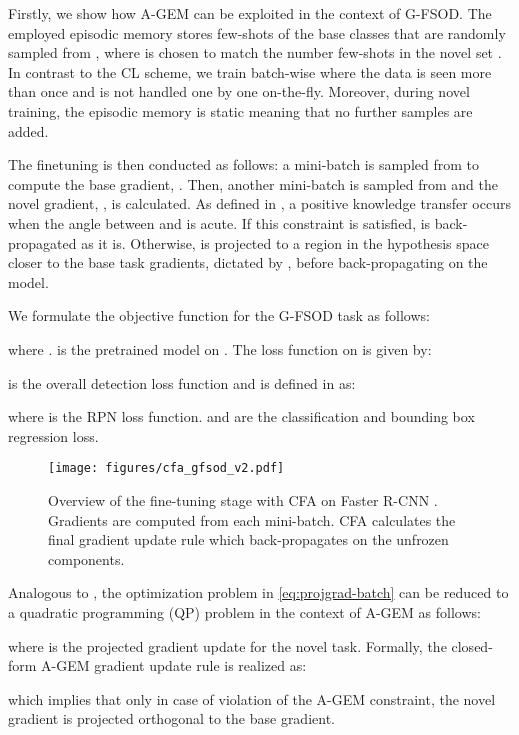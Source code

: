 \documentclass[10pt,twocolumn,letterpaper]{article}
\begin{document}
Firstly, we show how A-GEM \cite{agem} can be exploited in the context of G-FSOD. The employed episodic memory  stores few-shots  of the base classes that are randomly sampled from , where  is chosen to match the number few-shots in the novel set . In contrast to the CL scheme, we train batch-wise where the data is seen more than once and is not handled one by one on-the-fly. Moreover, during novel training, the episodic memory is static meaning that no further samples are added. 

The finetuning is then conducted as follows: a mini-batch is sampled from  to compute the base gradient, . Then, another mini-batch is sampled from  and the novel gradient, , is calculated. As defined in \cite{gem, agem}, a positive knowledge transfer occurs when the angle between  and  is acute. If this constraint is satisfied,  is back-propagated as it is. Otherwise,  is projected to a region in the hypothesis space closer to the base task gradients, dictated by , before back-propagating on the model. 

We formulate the objective function for the G-FSOD task as follows:  

where .  is the pretrained model on . The loss function on  is given by:



  is the overall detection loss function and is defined in \cite{FasterR-CNN} as:


where  is the RPN loss function.   and   are the classification and bounding box regression loss. 

 \begin{figure}[t!]
 \centering
 \texttt{[image: figures/cfa\_gfsod\_v2.pdf]}
 \caption{Overview of the fine-tuning stage with CFA on Faster R-CNN \cite{FasterR-CNN}. Gradients are computed from each mini-batch. CFA calculates the final gradient update rule which back-propagates on the unfrozen components.} \vspace{-2mm}
 \label{fig:cfa_gfsod}\end{figure} Analogous to \cite{gem, agem}, the optimization problem in \cref{eq:projgrad-batch} can be reduced to a quadratic programming (QP) problem in the context of A-GEM as follows:

where  is the projected gradient update for the novel task. Formally, the closed-form A-GEM gradient update rule is realized as:

which implies that only in case of violation of the A-GEM constraint, the novel gradient is projected orthogonal to the base gradient. 
\end{document}
